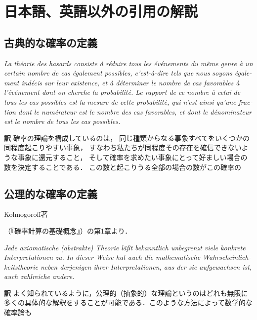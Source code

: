 \documentclass[main.tex]{subfiles}
\begin{document}
\chapter{日本語、英語以外の引用の解説}

\section{古典的な確率の定義}


\begin{quotebox}
\begin{french}
{\itshape
La théorie des hasards consiste à réduire tous les événements du même genre à un certain nombre
de cas également possibles, c'est-à-dire tels que nous soyons également indécis sur leur existence,
et à déterminer le nombre de cas favorables à l'événement dont on cherche la probabilité.
Le rapport de ce nombre à celui de tous les cas possibles est la mesure de cette probabilité,
qui n'est ainsi qu'une fraction dont le numérateur est le nombre des cas favorables,
et dont le dénominateur est le nombre de tous les cas possibles.}
\end{french}
\end{quotebox}

\noindent \textbf{\gtfamily 訳} 確率の理論を構成しているのは，
同じ種類からなる事象すべてをいくつかの同程度起こりやすい事象，
すなわち私たちが同程度その存在を確信できないような事象に還元すること，
そして確率を求めたい事象にとって好ましい場合の数を決定することである．
この数と起こりうる全部の場合の数がこの確率の




\section{公理的な確率の定義}

Kolmogoroff著\begin{german}\end{german}（『確率計算の基礎概念』）の第1章より．

\begin{quotebox}
\begin{german}{\itshape
Jede axiomatische (abstrakte) Theorie läßt
bekanntlich unbegrenzt viele konkrete Interpretationen zu.
In dieser Weise hat auch die mathematische Wahrscheinlichkeitstheorie
neben derjenigen ihrer Interpretationen,
aus der sie aufgewachsen ist,
auch zahlreiche andere.}
\end{german}
\end{quotebox}

\noindent \textbf{\gtfamily 訳} よく知られているように，公理的（抽象的）な理論というのはどれも無限に多くの具体的な解釈をすることが可能である．このような方法によって数学的な確率論も


\end{document}
